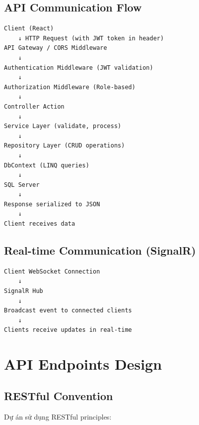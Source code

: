 \subsection{API Communication Flow}
\begin{verbatim}
Client (React)
    ↓ HTTP Request (with JWT token in header)
API Gateway / CORS Middleware
    ↓
Authentication Middleware (JWT validation)
    ↓
Authorization Middleware (Role-based)
    ↓
Controller Action
    ↓
Service Layer (validate, process)
    ↓
Repository Layer (CRUD operations)
    ↓
DbContext (LINQ queries)
    ↓
SQL Server
    ↓
Response serialized to JSON
    ↓
Client receives data
\end{verbatim}

\subsection{Real-time Communication (SignalR)}
\begin{verbatim}
Client WebSocket Connection
    ↓
SignalR Hub
    ↓
Broadcast event to connected clients
    ↓
Clients receive updates in real-time
\end{verbatim}

\section{API Endpoints Design}

\subsection{RESTful Convention}
Dự án sử dụng RESTful principles:

